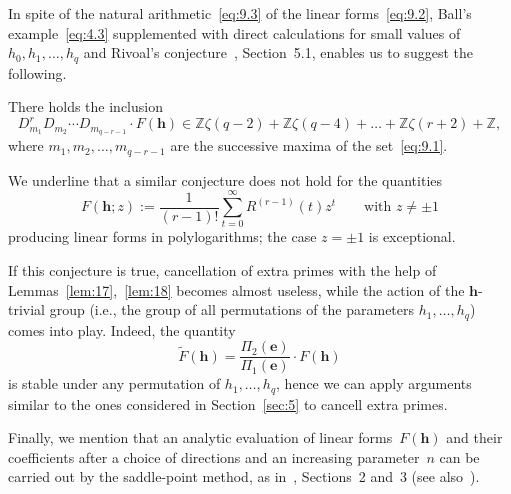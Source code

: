 \documentclass[a4paper,twoside]{article}
\numberwithin{equation}{section}
\renewcommand{\[}{\lfloor}
\renewcommand{\]}{\rfloor}
\newcommand{\<}{\langle}
\renewcommand{\>}{\rangle}
\newcommand{\wt}{\widetilde}
\newcommand{\be}{\boldsymbol e}
\newcommand{\bh}{\boldsymbol h}
\begin{document}
In spite of the natural arithmetic~\eqref{eq:9.3}
of the linear forms~\eqref{eq:9.2}, Ball's example~\eqref{eq:4.3}
supplemented with direct calculations for small
values of~$h_0,h_1,\dots,h_q$
and Rivoal's conjecture~\cite{Ri3}, Section~5.1,
enables us to suggest the following.

\begin{conj}
There holds the inclusion
$$
D_{m_1}^rD_{m_2}\dotsb D_{m_{q-r-1}}
\cdot F(\bh)\in\mathbb Z\zeta(q-2)
+\mathbb Z\zeta(q-4)+\dots
+\mathbb Z\zeta(r+2)+\mathbb Z,
$$
where $m_1,m_2,\dots,m_{q-r-1}$ are the successive maxima
of the set~\eqref{eq:9.1}.
\end{conj}

We underline that a similar conjecture does not hold for the quantities
$$
F(\bh;z):=\frac1{(r-1)!}\sum_{t=0}^\infty R^{(r-1)}(t)z^t
\qquad\mbox{with $z\ne\pm1$}
$$
producing linear forms in polylogarithms;
the case $z=\pm1$ is exceptional.

If this conjecture is true, cancellation of extra primes
with the help of Lemmas~\ref{lem:17},~\ref{lem:18}
becomes almost useless, while the
action of the $\bh$-trivial group (i.e., the group of all permutations
of the parameters $h_1,\dots,h_q$) comes into play. Indeed,
the quantity
$$
\wt F(\bh)=\frac{\varPi_2(\be)}{\varPi_1(\be)}\cdot F(\bh)
$$
is stable under any permutation of $h_1,\dots,h_q$,
hence we can apply arguments similar to the ones
considered in Section~\ref{sec:5}
to cancell extra primes.

Finally, we mention that an analytic evaluation of linear
forms~$F(\bh)$ and their coefficients after a choice of
directions and an increasing parameter~$n$ can be carried out
by the saddle-point method, as in~\cite{Zu3}, Sections~2 and~3
(see also~\cite{He,Ri4,Ne3}).
\end{document}
